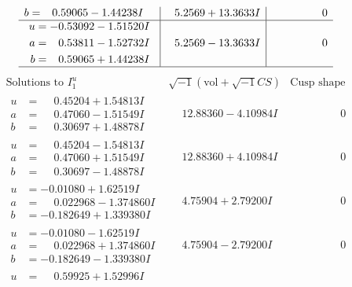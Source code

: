 \documentclass[1p]{elsarticle_modified}
\theoremstyle{definition}
\newcommand{\I}{\sqrt{-1}}
\begin{document}
$$\begin{array}{c|c|c}
\begin{aligned}
b &= \phantom{-}0.59065 - 1.44238 I\end{aligned}
 & \phantom{-}5.2569 + 13.3633 I & \phantom{-0.000000 } 0 \\ \hline\begin{aligned}
u &= -0.53092 - 1.51520 I \\
a &= \phantom{-}0.53811 - 1.52732 I \\
b &= \phantom{-}0.59065 + 1.44238 I\end{aligned}
 & \phantom{-}5.2569 - 13.3633 I & \phantom{-0.000000 } 0\\
 \hline 
 \end{array}$$\newpage$$\begin{array}{c|c|c}  
\text{Solutions to }I^u_{1}& \I (\text{vol} + \sqrt{-1}CS) & \text{Cusp shape}\\
 \hline 
\begin{aligned}
u &= \phantom{-}0.45204 + 1.54813 I \\
a &= \phantom{-}0.47060 - 1.51549 I \\
b &= \phantom{-}0.30697 + 1.48878 I\end{aligned}
 & \phantom{-}12.88360 - 4.10984 I & \phantom{-0.000000 } 0 \\ \hline\begin{aligned}
u &= \phantom{-}0.45204 - 1.54813 I \\
a &= \phantom{-}0.47060 + 1.51549 I \\
b &= \phantom{-}0.30697 - 1.48878 I\end{aligned}
 & \phantom{-}12.88360 + 4.10984 I & \phantom{-0.000000 } 0 \\ \hline\begin{aligned}
u &= -0.01080 + 1.62519 I \\
a &= \phantom{-}0.022968 - 1.374860 I \\
b &= -0.182649 + 1.339380 I\end{aligned}
 & \phantom{-}4.75904 + 2.79200 I & \phantom{-0.000000 } 0 \\ \hline\begin{aligned}
u &= -0.01080 - 1.62519 I \\
a &= \phantom{-}0.022968 + 1.374860 I \\
b &= -0.182649 - 1.339380 I\end{aligned}
 & \phantom{-}4.75904 - 2.79200 I & \phantom{-0.000000 } 0 \\ \hline\begin{aligned}
u &= \phantom{-}0.59925 + 1.52996 I \\

\end{aligned}
\end{array}$$
\end{document}
